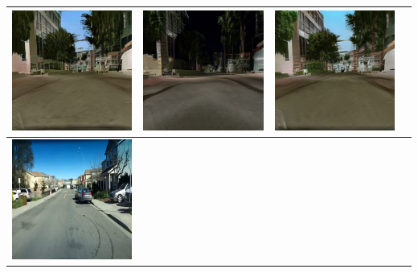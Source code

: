 \documentclass{VUMIFPSkursinis}
\begin{document}
\begin{table}[H]
{\begin{tabular}{|c|c|c|c|}
                \includegraphics[scale=0.35]{img/pvz/1_cycle_v2} & \includegraphics[scale=0.35]{img/pvz/1_cut_v2} & \includegraphics[scale=0.35]{img/pvz/1_mspc_v2}
                \\
                \hline
                \includegraphics[scale=0.35]{img/pvz/3_real} & 

\end{tabular}}
\end{table}
\end{document}
